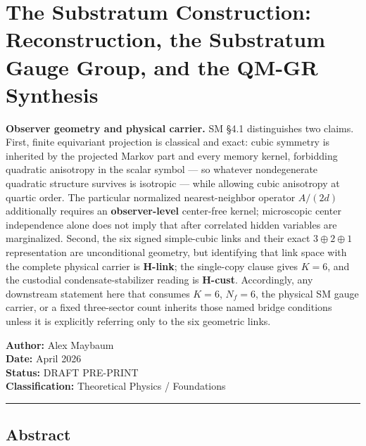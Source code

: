 \documentclass[
]{article}
\author{}
\date{}
\begin{document}
\hypertarget{the-substratum-construction-reconstruction-the-substratum-gauge-group-and-the-qm-gr-synthesis}{%
\section{The Substratum Construction: Reconstruction, the Substratum
Gauge Group, and the QM-GR
Synthesis}\label{the-substratum-construction-reconstruction-the-substratum-gauge-group-and-the-qm-gr-synthesis}}

\textbf{Observer geometry and physical carrier.} SM §4.1 distinguishes
two claims. First, finite equivariant projection is classical and exact:
cubic symmetry is inherited by the projected Markov part and every
memory kernel, forbidding quadratic anisotropy in the scalar symbol ---
so whatever nondegenerate quadratic structure survives is isotropic ---
while allowing cubic anisotropy at quartic order. The particular
normalized nearest-neighbor operator \(A/(2d)\) additionally requires an
\textbf{observer-level} center-free kernel; microscopic center
independence alone does not imply that after correlated hidden variables
are marginalized. Second, the six signed simple-cubic links and their
exact \(3\oplus2\oplus1\) representation are unconditional geometry, but
identifying that link space with the complete physical carrier is
\textbf{H-link}; the single-copy clause gives \(K=6\), and the custodial
condensate-stabilizer reading is \textbf{H-cust}. Accordingly, any
downstream statement here that consumes \(K=6\), \(N_f=6\), the physical
SM gauge carrier, or a fixed three-sector count inherits those named
bridge conditions unless it is explicitly referring only to the six
geometric links.

\textbf{Author:} Alex Maybaum\\
\textbf{Date:} April 2026\\
\textbf{Status:} DRAFT PRE-PRINT\\
\textbf{Classification:} Theoretical Physics / Foundations

\begin{center}\rule{0.5\linewidth}{0.5pt}\end{center}

\hypertarget{abstract}{%
\subsection{Abstract}\label{abstract}}
\end{document}
